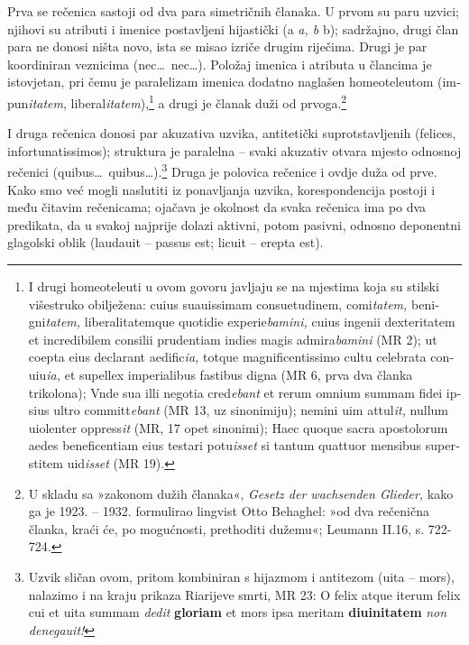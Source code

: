 \documentclass[a5paper,twoside]{article}
\begin{document}
Prva se rečenica sastoji od dva para simetričnih članaka. U prvom su paru uzvici; njihovi su atributi i imenice postavljeni hijastički (a \textit{a, b} b); sadržajno, drugi član para ne donosi ništa novo, ista se misao izriče drugim riječima. Drugi je par koordiniran veznicima \textlatin{(nec\dots\ nec\dots).} Položaj imenica i atributa u člancima je istovjetan, pri čemu je paralelizam imenica dodatno naglašen homeoteleutom \textlatin{(impun\textit{itatem}, liberal\textit{itatem}),}\footnote{I drugi homeoteleuti u ovom govoru javljaju se na mjestima koja su stilski višestruko obilježena: \textlatin{cuius suauissimam consuetudinem, comi\textit{tatem,} benigni\textit{tatem,} liberalitatemque quotidie experie\textit{bamini,} cuius ingenii dexteritatem et incredibilem consilii prudentiam indies magis admira\textit{bamini}} (MR 2); \textlatin{ut coepta eius declarant aedific\textit{ia,} totque magnificentissimo cultu celebrata conuiu\textit{ia,} et supellex imperialibus fastibus digna} (MR 6, prva dva članka trikolona); \textlatin{Vnde sua illi negotia cred\textit{ebant} et rerum omnium summam fidei ipsius ultro committ\textit{ebant}} (MR 13, uz sinonimiju); \textlatin{nemini uim attul\textit{it,} nullum uiolenter oppress\textit{it}} (MR, 17 opet sinonimi); \textlatin{Haec quoque sacra apostolorum aedes beneficentiam eius testari potu\textit{isset} si tantum quattuor mensibus superstitem uid\textit{isset}} (MR 19).} a drugi je članak duži od prvoga.\footnote{U skladu sa »zakonom dužih članaka«, \textit{Gesetz der wachsenden Glieder,} kako ga je 1923. – 1932. formulirao lingvist Otto Behaghel: »od dva rečenična članka, kraći će, po mogućnosti, prethoditi dužemu«; Leumann II.16, s. 722-724.}

I druga rečenica donosi par akuzativa uzvika, antitetički suprotstavljenih \textlatin{(felices, infortunatissimos);} struktura je paralelna – svaki akuzativ otvara mjesto odnosnoj rečenici \textlatin{(quibus\dots\ quibus\dots).}\footnote{Uzvik sličan ovom, pritom kombiniran s hijazmom i antitezom \textlatin{(uita – mors)}, nalazimo i na kraju prikaza Riarijeve smrti, MR 23: \textlatin{O felix atque iterum felix cui et uita summam \textit{dedit} \textbf{gloriam} et mors ipsa meritam \textbf{diuinitatem} \textit{non denegauit!}}} Druga je polovica rečenice i ovdje duža od prve. Kako smo već mogli naslutiti iz ponavljanja uzvika, korespondencija postoji i među čitavim rečenicama; ojačava je okolnost da svaka rečenica ima po dva predikata, da u svakoj najprije dolazi aktivni, potom pasivni, odnosno deponentni glagolski oblik \textlatin{(laudauit – passus est; licuit – erepta est).}
\end{document}
